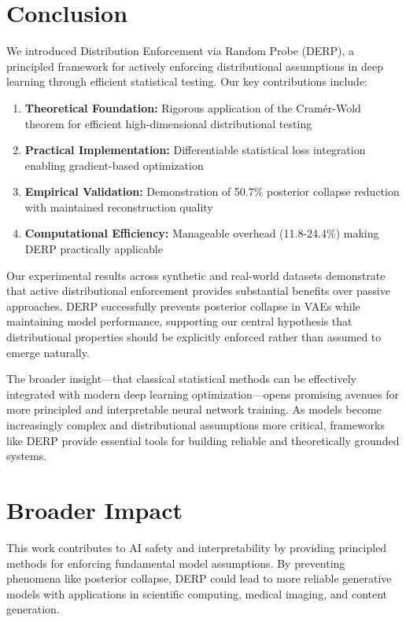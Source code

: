 \documentclass{article}
\begin{document}
\section{Conclusion}

We introduced Distribution Enforcement via Random Probe (DERP), a principled framework for actively enforcing distributional assumptions in deep learning through efficient statistical testing. Our key contributions include:

\begin{enumerate}
\item \textbf{Theoretical Foundation:} Rigorous application of the Cramér-Wold theorem for efficient high-dimensional distributional testing
\item \textbf{Practical Implementation:} Differentiable statistical loss integration enabling gradient-based optimization
\item \textbf{Empirical Validation:} Demonstration of 50.7\% posterior collapse reduction with maintained reconstruction quality
\item \textbf{Computational Efficiency:} Manageable overhead (11.8-24.4\%) making DERP practically applicable
\end{enumerate}

Our experimental results across synthetic and real-world datasets demonstrate that active distributional enforcement provides substantial benefits over passive approaches. DERP successfully prevents posterior collapse in VAEs while maintaining model performance, supporting our central hypothesis that distributional properties should be explicitly enforced rather than assumed to emerge naturally.

The broader insight—that classical statistical methods can be effectively integrated with modern deep learning optimization—opens promising avenues for more principled and interpretable neural network training. As models become increasingly complex and distributional assumptions more critical, frameworks like DERP provide essential tools for building reliable and theoretically grounded systems.

\section*{Broader Impact}

This work contributes to AI safety and interpretability by providing principled methods for enforcing fundamental model assumptions. By preventing phenomena like posterior collapse, DERP could lead to more reliable generative models with applications in scientific computing, medical imaging, and content generation.
\end{document}
